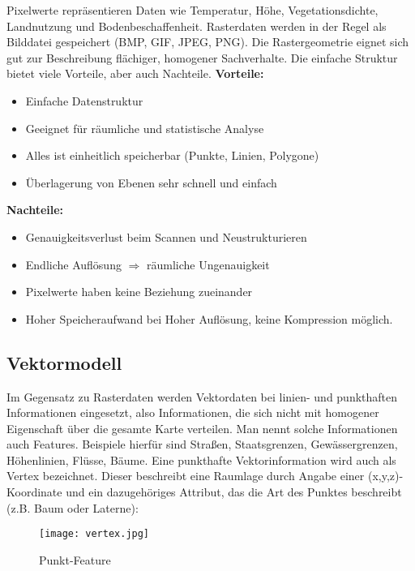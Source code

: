 \documentclass[11pt,ceqn]{book}
\begin{document}
Pixelwerte repräsentieren Daten wie Temperatur, Höhe, Vegetationsdichte, Landnutzung und Bodenbeschaffenheit. Rasterdaten werden in der Regel als Bilddatei gespeichert (BMP, GIF, JPEG, PNG).
\newline
Die Rastergeometrie eignet sich gut zur Beschreibung flächiger, homogener Sachverhalte. Die einfache Struktur bietet viele Vorteile, aber auch Nachteile. \newline
\textbf{Vorteile:}
\begin{itemize}
\item Einfache Datenstruktur 
\item Geeignet für räumliche und statistische Analyse
\item Alles ist einheitlich speicherbar (Punkte, Linien, Polygone)
\item Überlagerung von Ebenen sehr schnell und einfach
\end{itemize}
\textbf{Nachteile:}
\begin{itemize}
\item Genauigkeitsverlust beim Scannen und Neustrukturieren
\item Endliche Auflösung $\Rightarrow$ räumliche Ungenauigkeit
\item Pixelwerte haben keine Beziehung zueinander
\item Hoher Speicheraufwand bei Hoher Auflösung, keine Kompression möglich.
\end{itemize}

\subsection{Vektormodell}
Im Gegensatz zu Rasterdaten werden Vektordaten bei linien- und punkthaften Informationen eingesetzt, also Informationen, die sich nicht mit homogener Eigenschaft über die gesamte Karte verteilen. Man nennt solche Informationen auch Features. Beispiele hierfür sind Straßen, Staatsgrenzen, Gewässergrenzen, Höhenlinien, Flüsse, Bäume.
\newline
Eine punkthafte Vektorinformation wird auch als Vertex bezeichnet. Dieser beschreibt eine Raumlage durch Angabe einer (x,y,z)-Koordinate und ein dazugehöriges Attribut, das die Art des Punktes beschreibt (z.B. Baum oder Laterne):

\begin{figure}[H]
\centering
\texttt{[image: vertex.jpg]}
\caption{Punkt-Feature \protect\footnotemark}
\end{figure}
\end{document}

